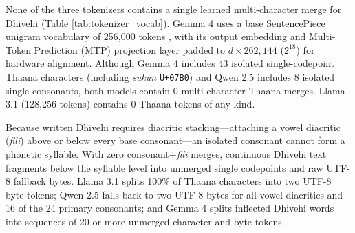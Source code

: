 \documentclass[acmsmall,review,anonymous]{acmart}
\begin{document}
None of the three tokenizers contains a single learned multi-character merge for Dhivehi (Table \ref{tab:tokenizer_vocab}). Gemma 4 uses a base SentencePiece \cite{kudo_sentencepiece_2018} unigram vocabulary of 256,000 tokens \cite{team_gemma_2026}, with its output embedding and Multi-Token Prediction (MTP) projection layer padded to $d \times 262,144$ ($2^{18}$) for hardware alignment. Although Gemma 4 includes 43 isolated single-codepoint Thaana characters (including \textit{sukun} \texttt{U+07B0}) and Qwen 2.5 \cite{qwen_qwen25_2025} includes 8 isolated single consonants, both models contain 0 multi-character Thaana merges. Llama 3.1 (128,256 tokens) \cite{grattafiori_llama_2024} contains 0 Thaana tokens of any kind.

Because written Dhivehi requires diacritic stacking---attaching a vowel diacritic (\textit{fili}) above or below every base consonant---an isolated consonant cannot form a phonetic syllable. With zero consonant+\textit{fili} merges, continuous Dhivehi text fragments below the syllable level into unmerged single codepoints and raw UTF-8 fallback bytes. Llama 3.1 splits 100\% of Thaana characters into two UTF-8 byte tokens; Qwen 2.5 falls back to two UTF-8 bytes for all vowel diacritics and 16 of the 24 primary consonants; and Gemma 4 splits inflected Dhivehi words into sequences of 20 or more unmerged character and byte tokens.
\end{document}
